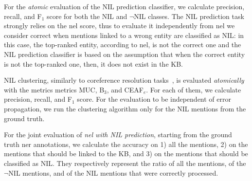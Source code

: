 For the \textit{atomic} evaluation of the NIL prediction classifier, we calculate precision, recall, and F$_1$ score for both the NIL and $\neg$NIL classes. The NIL prediction task strongly relies on the \ac{nel} score, thus to evaluate it independently from \ac{nel} we consider correct when mentions linked to a wrong entity are classified as NIL: in this case, the top-ranked entity, according to \ac{nel}, is not the correct one and the NIL prediction classifier is based on the assumption that when the correct entity is not the top-ranked one, then, it does not exist in the KB.

NIL clustering, similarly to coreference resolution tasks~\cite{streaming_crossdoc_coreference}, is evaluated \textit{atomically} with the metrics metrics MUC, B$_3$, and CEAF$_e$. For each of them, we calculate precision, recall, and F$_1$ score.
For the evaluation to be independent of error propagation, we run the clustering algorithm only for the NIL mentions from the ground truth.

For the joint evaluation of \textit{\ac{nel} with NIL prediction}, starting from the ground truth \ac{ner} annotations, we calculate the accuracy on 1) all the mentions, 2) on the mentions that should be linked to the KB, and 3) on the mentions that should be classified as NIL. They respectively represent the ratio of all the mentions, of the $\neg$NIL mentions, and of the NIL mentions that were correctly processed.


